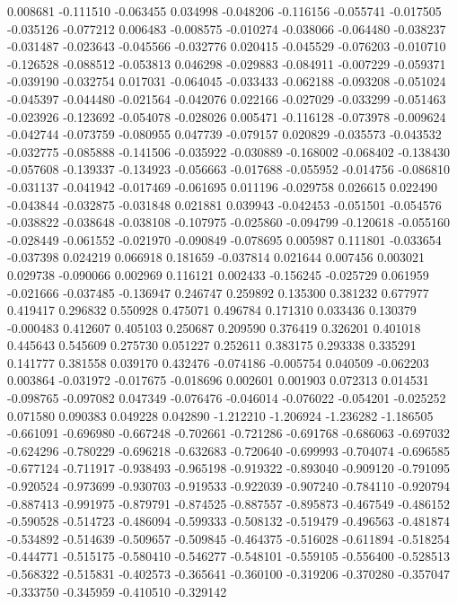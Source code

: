 0.008681
-0.111510
-0.063455
0.034998
-0.048206
-0.116156
-0.055741
-0.017505
-0.035126
-0.077212
0.006483
-0.008575
-0.010274
-0.038066
-0.064480
-0.038237
-0.031487
-0.023643
-0.045566
-0.032776
0.020415
-0.045529
-0.076203
-0.010710
-0.126528
-0.088512
-0.053813
0.046298
-0.029883
-0.084911
-0.007229
-0.059371
-0.039190
-0.032754
0.017031
-0.064045
-0.033433
-0.062188
-0.093208
-0.051024
-0.045397
-0.044480
-0.021564
-0.042076
0.022166
-0.027029
-0.033299
-0.051463
-0.023926
-0.123692
-0.054078
-0.028026
0.005471
-0.116128
-0.073978
-0.009624
-0.042744
-0.073759
-0.080955
0.047739
-0.079157
0.020829
-0.035573
-0.043532
-0.032775
-0.085888
-0.141506
-0.035922
-0.030889
-0.168002
-0.068402
-0.138430
-0.057608
-0.139337
-0.134923
-0.056663
-0.017688
-0.055952
-0.014756
-0.086810
-0.031137
-0.041942
-0.017469
-0.061695
0.011196
-0.029758
0.026615
0.022490
-0.043844
-0.032875
-0.031848
0.021881
0.039943
-0.042453
-0.051501
-0.054576
-0.038822
-0.038648
-0.038108
-0.107975
-0.025860
-0.094799
-0.120618
-0.055160
-0.028449
-0.061552
-0.021970
-0.090849
-0.078695
0.005987
0.111801
-0.033654
-0.037398
0.024219
0.066918
0.181659
-0.037814
0.021644
0.007456
0.003021
0.029738
-0.090066
0.002969
0.116121
0.002433
-0.156245
-0.025729
0.061959
-0.021666
-0.037485
-0.136947
0.246747
0.259892
0.135300
0.381232
0.677977
0.419417
0.296832
0.550928
0.475071
0.496784
0.171310
0.033436
0.130379
-0.000483
0.412607
0.405103
0.250687
0.209590
0.376419
0.326201
0.401018
0.445643
0.545609
0.275730
0.051227
0.252611
0.383175
0.293338
0.335291
0.141777
0.381558
0.039170
0.432476
-0.074186
-0.005754
0.040509
-0.062203
0.003864
-0.031972
-0.017675
-0.018696
0.002601
0.001903
0.072313
0.014531
-0.098765
-0.097082
0.047349
-0.076476
-0.046014
-0.076022
-0.054201
-0.025252
0.071580
0.090383
0.049228
0.042890
-1.212210
-1.206924
-1.236282
-1.186505
-0.661091
-0.696980
-0.667248
-0.702661
-0.721286
-0.691768
-0.686063
-0.697032
-0.624296
-0.780229
-0.696218
-0.632683
-0.720640
-0.699993
-0.704074
-0.696585
-0.677124
-0.711917
-0.938493
-0.965198
-0.919322
-0.893040
-0.909120
-0.791095
-0.920524
-0.973699
-0.930703
-0.919533
-0.922039
-0.907240
-0.784110
-0.920794
-0.887413
-0.991975
-0.879791
-0.874525
-0.887557
-0.895873
-0.467549
-0.486152
-0.590528
-0.514723
-0.486094
-0.599333
-0.508132
-0.519479
-0.496563
-0.481874
-0.534892
-0.514639
-0.509657
-0.509845
-0.464375
-0.516028
-0.611894
-0.518254
-0.444771
-0.515175
-0.580410
-0.546277
-0.548101
-0.559105
-0.556400
-0.528513
-0.568322
-0.515831
-0.402573
-0.365641
-0.360100
-0.319206
-0.370280
-0.357047
-0.333750
-0.345959
-0.410510
-0.329142
